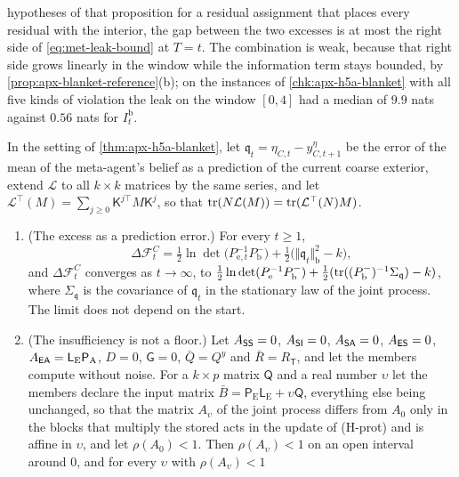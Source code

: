 hypotheses of that proposition for a residual assignment that places every residual with the interior, the gap between the two excesses is at most the right side of \eqref{eq:met-leak-bound} at $T=t$. The combination is weak, because that right side grows linearly in the window while the information term stays bounded, by \cref{prop:apx-blanket-reference}(b); on the instances of \cref{chk:apx-h5a-blanket} with all five kinds of violation the leak on the window $[0,4]$ had a median of $9.9$ nats against $0.56$ nats for $I^{\mathrm b}_t$.

\begin{proposition}\label{prop:apx-blanket-input}
In the setting of \cref{thm:apx-h5a-blanket}, let $\mathfrak q_t=\eta_{C,t}-y^\eta_{C,t+1}$ be the error of the mean of the meta-agent's belief as a prediction of the current coarse exterior, extend $\mathcal L$ to all $k\times k$ matrices by the same series, and let $\mathcal L^\top(M)=\sum_{j\ge0}\mathsf K^{j\top}M\mathsf K^j$, so that $\operatorname{tr}(N\mathcal L(M))=\operatorname{tr}(\mathcal L^\top(N)M)$.
\begin{enumerate}
\item[(a)] (The excess as a prediction error.) For every $t\ge1$,
\begin{equation}\label{eq:apx-blanket-prediction}
\Delta\mathcal F^C_t=\tfrac12\ln\det\bigl(P_{\mathrm e,t}^{-1}P^-_{\mathrm b}\bigr)+\tfrac12\bigl(\Vert\mathfrak q_t\Vert_{\mathrm b}^2-k\bigr),
\end{equation}
and $\Delta\mathcal F^C_t$ converges as $t\to\infty$, to $\frac12\ln\det(P_{\mathrm e}^{-1}P^-_{\mathrm b})+\frac12(\operatorname{tr}((P^-_{\mathrm b})^{-1}\Sigma_{\mathfrak q})-k)$, where $\Sigma_{\mathfrak q}$ is the covariance of $\mathfrak q_t$ in the stationary law of the joint process. The limit does not depend on the start.
\item[(b)] (The insufficiency is not a floor.) Let $A_{\mathsf{S}\mathsf{S}}=0$, $A_{\mathsf{S}\mathsf{I}}=0$, $A_{\mathsf{S}\mathsf{A}}=0$, $A_{\mathsf{E}\mathsf{S}}=0$, $A_{\mathsf{E}\mathsf{A}}=\mathsf L_{\mathrm E}\mathsf P_{\mathrm A}$, $D=0$, $\mathsf G=0$, $\bar Q=Q^y$ and $\bar R=R_{\mathsf T}$, and let the members compute without noise. For a $k\times p$ matrix $\mathsf Q$ and a real number $\upsilon$ let the members declare the input matrix $\bar B=\mathsf P_{\mathrm E}\mathsf L_{\mathrm E}+\upsilon\mathsf Q$, everything else being unchanged, so that the matrix $A_\upsilon$ of the joint process differs from $A_0$ only in the blocks that multiply the stored acts in the update of (H-prot) and is affine in $\upsilon$, and let $\rho(A_0)<1$. Then $\rho(A_\upsilon)<1$ on an open interval around $0$, and for every $\upsilon$ with $\rho(A_\upsilon)<1$

\end{enumerate}
\end{proposition}

